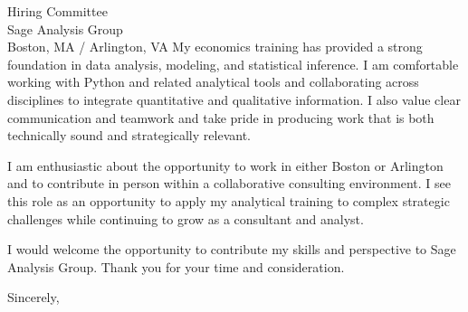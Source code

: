 \documentclass[11pt]{letter}
\begin{document}
\begin{letter}{Hiring Committee \\ Sage Analysis Group \\ Boston, MA / Arlington, VA}
My economics training has provided a strong foundation in data analysis, modeling, and statistical inference. I am comfortable working with Python and related analytical tools and collaborating across disciplines to integrate quantitative and qualitative information. I also value clear communication and teamwork and take pride in producing work that is both technically sound and strategically relevant.

I am enthusiastic about the opportunity to work in either Boston or Arlington and to contribute in person within a collaborative consulting environment. I see this role as an opportunity to apply my analytical training to complex strategic challenges while continuing to grow as a consultant and analyst.

I would welcome the opportunity to contribute my skills and perspective to Sage Analysis Group. Thank you for your time and consideration.

\closing{Sincerely,}

\end{letter}
\end{document}

